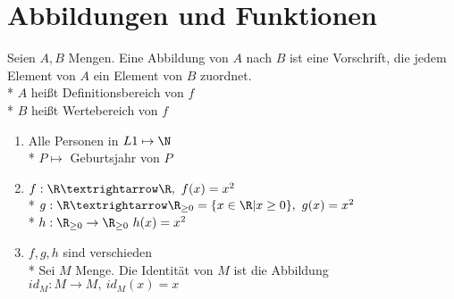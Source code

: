 %
\chapter{Abbildungen und Funktionen}
Seien $A, B$ Mengen. Eine Abbildung von $A$ nach $B$ ist eine Vorschrift, die jedem Element von $A$ ein Element von $B$ zuordnet.\\*
%
$A$ heißt Definitionsbereich von $f$\\*
$B$ heißt Wertebereich von $f$
%
\bsp
\begin{enumerate}
\item {Alle Personen in $L1 \mapsto \N$\\*
$P \mapsto$ Geburtsjahr von $P$}
%
\item{$f:\R → \R, \ f(x)=x^2$\\*
$g:\R→\R_{\geq 0}=\{x\in\R|x\geq 0\}, \ g(x)=x^2$\\*
$h: \R_{\geq 0} \to \R_{\geq 0} \ h(x) = x^2$}
\bem 
\item{
$f,g,h$ sind verschieden\\*
Sei $M$ Menge. Die Identität von $M$ ist die Abbildung $id_{M}:M→M, \ id_M(x)=x$}
\end{enumerate}

